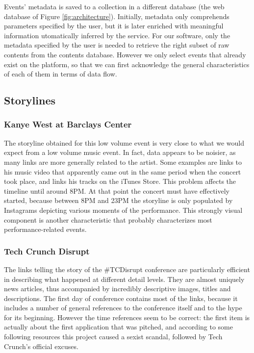 \documentclass{sig-alternate}
\begin{document}
Events' metadata is saved to a collection in a different database (the web database of Figure \ref{fig:architecture}). Initially, metadata only comprehends parameters specified by the user, but it is later enriched with meaningful information utomatically inferred by the service. For our software, only the metadata specified by the user is needed to retrieve the right subset of raw contents from the contents database. However we only select events that already exist on the platform, so that we can first acknowledge the general characteristics of each of them in terms of data flow.

\subsection{Storylines}
\label{sec:storylines}
\subsubsection{Kanye West at Barclays Center}
The storyline obtained for this low volume event is very close to what we would expect from a low volume music event. In fact, data appears to be noisier, as many links are more generally related to the artist. Some examples are links to his music video that apparently came out in the same period when the concert took place, and links his tracks on the iTunes Store. This problem affects the timeline until around 8PM. At that point the concert must have effectively started, because between 8PM and 23PM the storyline is only populated by Instagrams depicting various moments of the performance. This strongly visual component is another characteristic that probably characterizes most performance-related events.

\subsubsection{Tech Crunch Disrupt}
The links telling the story of the \#TCDisrupt conference are particularly efficient in describing what happened at different detail levels. They are almost uniquely news articles, thus accompanied by incredibly descriptive images, titles and descriptions. The first day of conference contains most of the links, because it includes a number of general references to the conference itself and to the hype for its beginning. However the time references seem to be correct: the first item is actually about the first application that was pitched, and according to some following resources this project caused a sexist scandal, followed by Tech Crunch's official excuses.
\end{document}
